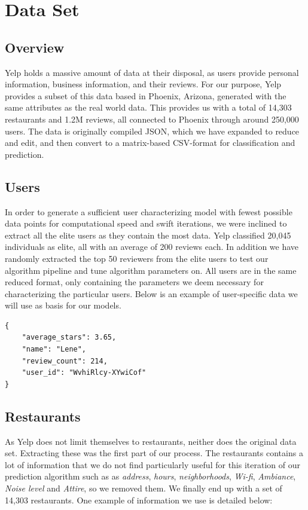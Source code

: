 \documentclass[10pt,twocolumn,letterpaper]{article}
\begin{document}

\section{Data Set}

\subsection{Overview}
Yelp holds a massive amount of data at their disposal, as users provide personal information, business information, and their reviews. For our purpose, Yelp provides a subset of this data based in Phoenix, Arizona, generated with the same attributes as the real world data. This provides us with a total of 14,303 restaurants and 1.2M reviews, all connected to Phoenix through around 250,000 users. The data is originally compiled JSON, which we have expanded to reduce and edit, and then convert to a matrix-based CSV-format for classification and prediction.

\subsection{Users}
In order to generate a sufficient user characterizing model with fewest possible data points for computational speed and swift iterations, we were inclined to extract all the elite users as they contain the most data. Yelp classified 20,045 individuals as elite, all with an average of 200 reviews each. In addition we have randomly extracted the top 50 reviewers from the elite users to test our algorithm pipeline and tune algorithm parameters on. All users are in the same reduced format, only containing the parameters we deem necessary for characterizing the particular users. Below is an example of user-specific data we will use as basis for our models.

\begin{verbatim}
{
    "average_stars": 3.65,
    "name": "Lene",
    "review_count": 214,
    "user_id": "WvhiRlcy-XYwiCof"
}
\end{verbatim}

\subsection{Restaurants}
As Yelp does not limit themselves to restaurants, neither does the original data set. Extracting these was the first part of our process. The restaurants contains a lot of information that we do not find particularly useful for this iteration of our prediction algorithm such as as \textit{address}, \textit{hours}, \textit{neighborhoods}, \textit{Wi-fi}, \textit{Ambiance}, \textit{Noise level} and \textit{Attire}, so we removed them. We finally end up with a set of 14,303 restaurants. One example of information we use is detailed below:
\end{document}
